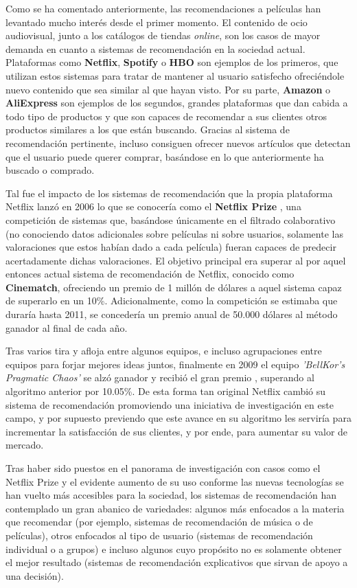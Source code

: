 Como se ha comentado anteriormente, las recomendaciones a películas han levantado mucho interés desde el primer momento. El contenido de ocio audiovisual, junto a los catálogos de tiendas \textit{online}, son los casos de mayor demanda en cuanto a sistemas de recomendación en la sociedad actual. Plataformas como \textbf{Netflix}, \textbf{Spotify} o \textbf{HBO} son ejemplos de los primeros, que utilizan estos sistemas para tratar de mantener al usuario satisfecho ofreciéndole nuevo contenido que sea similar al que hayan visto. Por su parte, \textbf{Amazon} o \textbf{AliExpress} son ejemplos de los segundos, grandes plataformas que dan cabida a todo tipo de productos y que son capaces de recomendar a sus clientes otros productos similares a los que están buscando. Gracias al sistema de recomendación pertinente, incluso consiguen ofrecer nuevos artículos que detectan que el usuario puede querer comprar, basándose en lo que anteriormente ha buscado o comprado.

Tal fue el impacto de los sistemas de recomendación que la propia plataforma Netflix lanzó en 2006 lo que se conocería como el \textbf{Netflix Prize} \cite{netflix-prize}, una competición de sistemas que, basándose únicamente en el filtrado colaborativo (no conociendo datos adicionales sobre películas ni sobre usuarios, solamente las valoraciones que estos habían dado a cada película) fueran capaces de predecir acertadamente dichas valoraciones. El objetivo principal era superar al por aquel entonces actual sistema de recomendación de Netflix, conocido como \textbf{Cinematch}, ofreciendo un premio de 1 millón de dólares a aquel sistema capaz de superarlo en un 10\%. Adicionalmente, como la competición se estimaba que duraría hasta 2011, se concedería un premio anual de 50.000 dólares al método ganador al final de cada año.

Tras varios tira y afloja entre algunos equipos, e incluso agrupaciones entre equipos para forjar mejores ideas juntos, finalmente en 2009 el equipo \textit{'BellKor's Pragmatic Chaos'} se alzó ganador y recibió el gran premio \cite{netflix-prize-winner}, superando al algoritmo anterior por 10.05\%. De esta forma tan original Netflix cambió su sistema de recomendación promoviendo una iniciativa de investigación en este campo, y por supuesto previendo que este avance en su algoritmo les serviría para incrementar la satisfacción de sus clientes, y por ende, para aumentar su valor de mercado.

Tras haber sido puestos en el panorama de investigación con casos como el Netflix Prize y el evidente aumento de su uso conforme las nuevas tecnologías se han vuelto más accesibles para la sociedad, los sistemas de recomendación han contemplado un gran abanico de variedades: algunos más enfocados a la materia que recomendar (por ejemplo, sistemas de recomendación de música o de películas), otros enfocados al tipo de usuario (sistemas de recomendación individual o a grupos) e incluso algunos cuyo propósito no es solamente obtener el mejor resultado (sistemas de recomendación explicativos que sirvan de apoyo a una decisión).

